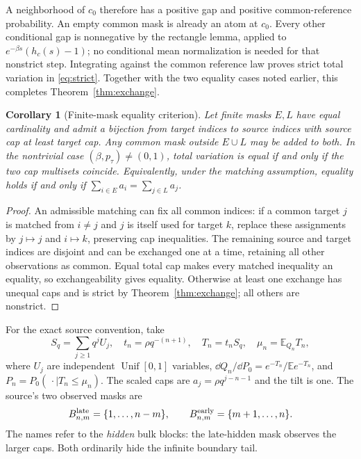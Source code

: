 \documentclass[11pt,a4paper]{article}
\newtheorem{corollary}[theorem]{Corollary}\newtheorem{proposition}[theorem]{Proposition}
\theoremstyle{remark}\newtheorem*{ednote}{Editorial note (ProveIt, 2026-10-01)}
\newcommand{\E}{\mathbb E}\newcommand{\R}{\mathbb R}
\begin{document}
A neighborhood of $c_0$ therefore has a positive gap and positive common-reference probability. An empty common mask is already an atom at $c_0$. Every other conditional gap is nonnegative by the rectangle lemma, applied to $e^{-\beta s}(h_c(s)-1)$; no conditional mean normalization is needed for that nonstrict step. Integrating against the common reference law proves strict total variation in \eqref{eq:strict}. Together with the two equality cases noted earlier, this completes Theorem~\ref{thm:exchange}.

\begin{corollary}[Finite-mask equality criterion]\label{cor:masks}
Let finite masks $E,L$ have equal cardinality and admit a bijection from target indices to source indices with source cap at least target cap. Any common mask outside $E\cup L$ may be added to both. In the nontrivial case $(\beta,p_\tau)\ne(0,1)$, total variation is equal if and only if the two cap multisets coincide. Equivalently, under the matching assumption, equality holds if and only if $\sum_{i\in E}a_i=\sum_{j\in L}a_j$.
\end{corollary}
\begin{proof}
An admissible matching can fix all common indices: if a common target $j$ is matched from $i\ne j$ and $j$ is itself used for target $k$, replace these assignments by $j\mapsto j$ and $i\mapsto k$, preserving cap inequalities. The remaining source and target indices are disjoint and can be exchanged one at a time, retaining all other observations as common. Equal total cap makes every matched inequality an equality, so exchangeability gives equality. Otherwise at least one exchange has unequal caps and is strict by Theorem~\ref{thm:exchange}; all others are nonstrict.
\end{proof}

For the exact source convention, take
\[
 S_q=\sum_{j\ge1}q^jU_j,\quad t_n=\rho q^{-(n+1)},\quad T_n=t_nS_q,
 \quad \mu_n=\E_{Q_n}T_n,
\]
where $U_j$ are independent $\operatorname{Unif}[0,1]$ variables, $\dd Q_n/\dd P_0=e^{-T_n}/\E e^{-T_n}$, and $P_n=P_0(\,\cdot\mid T_n\le\mu_n)$. The scaled caps are $a_j=\rho q^{j-n-1}$ and the tilt is one. The source's two observed masks are
\[
 B^{\rm late}_{n,m}=\{1,\ldots,n-m\},\qquad
 B^{\rm early}_{n,m}=\{m+1,\ldots,n\}.
\]
The names refer to the \emph{hidden} bulk blocks: the late-hidden mask observes the larger caps. Both ordinarily hide the infinite boundary tail.
\end{document}
